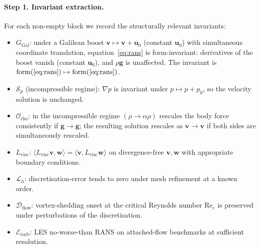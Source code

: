 \paragraph{Step 1. Invariant extraction.} For each non-empty block we record the structurally relevant invariants:
\begin{itemize}
    \item $G_{\mathrm{Gal}}$: under a Galilean boost $\mathbf{v} \mapsto \mathbf{v} + \mathbf{u}_0$ (constant $\mathbf{u}_0$) with simultaneous coordinate translation, equation~\eqref{eq:rans} is form-invariant: derivatives of the boost vanish (constant $\mathbf{u}_0$), and $\rho\mathbf{g}$ is unaffected. The invariant is $\mathrm{form}(\eqref{eq:rans}) \mapsto \mathrm{form}(\eqref{eq:rans})$.
    \item $\mathcal{S}_p$ (incompressible regime): $\nabla p$ is invariant under $p \mapsto p + p_0$, so the velocity solution is unchanged.
    \item $\mathcal{O}_{\mathrm{rho}}$: in the incompressible regime $(\rho \to \alpha \rho)$ rescales the body force consistently if $\mathbf{g} \to \mathbf{g}$; the resulting solution rescales as $\mathbf{v}\to\mathbf{v}$ if both sides are simultaneously rescaled.
    \item $L_{\mathrm{visc}}$: $\langle L_{\mathrm{visc}}\mathbf{v},\mathbf{w}\rangle = \langle \mathbf{v}, L_{\mathrm{visc}}\mathbf{w}\rangle$ on divergence-free $\mathbf{v},\mathbf{w}$ with appropriate boundary conditions.
    \item $\mathcal{L}_h$: discretisation-error tends to zero under mesh refinement at a known order.
    \item $\mathcal{D}_{\mathrm{flow}}$: vortex-shedding onset at the critical Reynolds number $\mathrm{Re}_c$ is preserved under perturbations of the discretisation.
    \item $\mathcal{E}_{\mathrm{turb}}$: LES no-worse-than RANS on attached-flow benchmarks at sufficient resolution.
\end{itemize}

